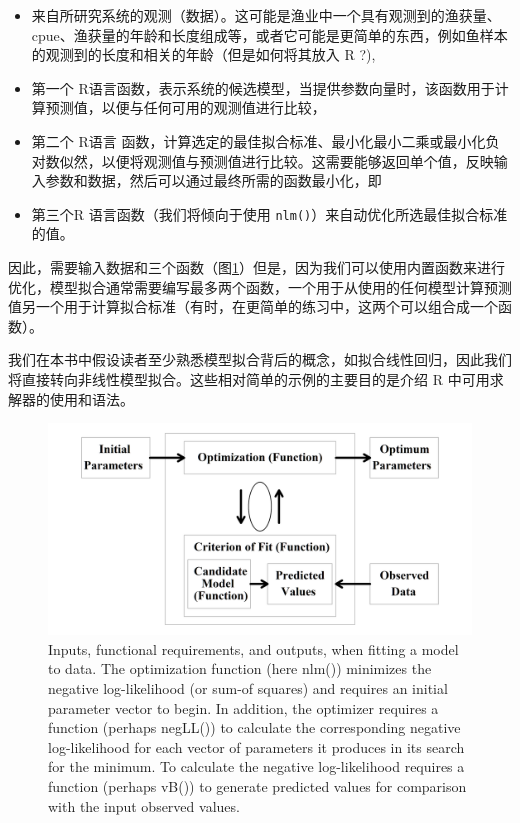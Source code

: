 \documentclass[
  lang=cn,
  11pt,
  scheme=chinese,
  chinesefont=nofont,
  citestyle=gb7714-2015,
  bibstyle=gb7714-2015]{elegantbook}
\begin{document}
\begin{itemize}
\item
  来自所研究系统的观测（数据）。这可能是渔业中一个具有观测到的渔获量、cpue、渔获量的年龄和长度组成等，或者它可能是更简单的东西，例如鱼样本的观测到的长度和相关的年龄（但是如何将其放入 R ?),
\item
  第一个 R语言函数，表示系统的候选模型，当提供参数向量时，该函数用于计算预测值，以便与任何可用的观测值进行比较，
\item
  第二个 R语言 函数，计算选定的最佳拟合标准、最小化最小二乘或最小化负对数似然，以便将观测值与预测值进行比较。这需要能够返回单个值，反映输入参数和数据，然后可以通过最终所需的函数最小化，即
\item
  第三个R 语言函数（我们将倾向于使用 \texttt{nlm()}）来自动优化所选最佳拟合标准的值。
\end{itemize}

因此，需要输入数据和三个函数（图\ref{fig:fig41}）但是，因为我们可以使用内置函数来进行优化，模型拟合通常需要编写最多两个函数，一个用于从使用的任何模型计算预测值另一个用于计算拟合标准（有时，在更简单的练习中，这两个可以组合成一个函数）。

我们在本书中假设读者至少熟悉模型拟合背后的概念，如拟合线性回归，因此我们将直接转向非线性模型拟合。这些相对简单的示例的主要目的是介绍 R 中可用求解器的使用和语法。

\begin{figure}

{\centering \includegraphics[width=0.5\linewidth]{f401-1} 

}

\caption{Inputs, functional requirements, and outputs, when fitting a model to data. The optimization function (here nlm()) minimizes the negative log-likelihood (or sum-of squares) and requires an initial parameter vector to begin. In addition, the optimizer requires a function (perhaps negLL()) to calculate the corresponding negative log-likelihood for each vector of parameters it produces in its search for the minimum. To calculate the negative log-likelihood requires a function (perhaps vB()) to generate predicted values for comparison with the input observed values.}\label{fig:fig41}
\end{figure}
\end{document}
